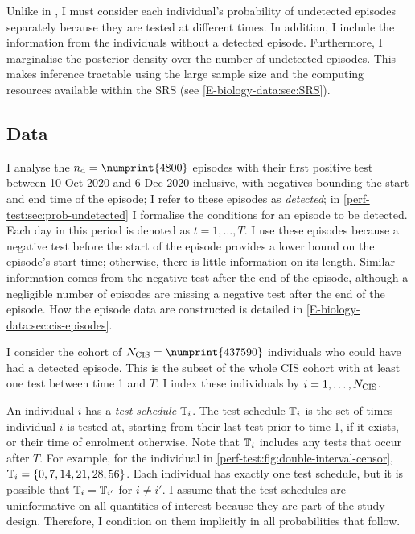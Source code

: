 \documentclass[thesis.tex]{subfiles}
\begin{document}
Unlike in \textcite{heiseyModelling}, I must consider each individual's probability of undetected episodes separately because they are tested at different times.
In addition, I include the information from the individuals without a detected episode.
Furthermore, I marginalise the posterior density over the number of undetected episodes.
This makes inference tractable using the large sample size and the computing resources available within the SRS (see \cref{E-biology-data:sec:SRS}).

\subsection{Data} \label{perf-test:sec:data}

I analyse the $\ndet = \numprint{4800}$ episodes with their first positive test between 10 Oct 2020 and 6 Dec 2020 inclusive, with negatives bounding the start and end time of the episode; I refer to these episodes as \emph{detected}; in \cref{perf-test:sec:prob-undetected} I formalise the conditions for an episode to be detected.
Each day in this period is denoted as $t = 1, \dots, T$.
I use these episodes because a negative test before the start of the episode provides a lower bound on the episode's start time; otherwise, there is little information on its length.
Similar information comes from the negative test after the end of the episode, although a negligible number of episodes are missing a negative test after the end of the episode.
How the episode data are constructed is detailed in \cref{E-biology-data:sec:cis-episodes}.

I consider the cohort of $\Ncis = \numprint{437590}$ individuals who could have had a detected episode.
This is the subset of the whole CIS cohort with at least one test between time 1 and $T$.
I index these individuals by $i = 1, \dots, N_\text{CIS}$.

An individual $i$ has a \emph{test schedule} $\mathbb{T}_i$.
The test schedule $\mathbb{T}_i$ is the set of times individual $i$ is tested at, starting from their last test prior to time 1, if it exists, or their time of enrolment otherwise.
Note that $\mathbb{T}_i$ includes any tests that occur after $T$.
For example, for the individual in \cref{perf-test:fig:double-interval-censor}, $\mathbb{T}_i = \{ 0, 7, 14, 21, 28, 56 \}$.
Each individual has exactly one test schedule, but it is possible that $\mathbb{T}_i = \mathbb{T}_{i'}$ for $i \neq i'$.
I assume that the test schedules are uninformative on all quantities of interest because they are part of the study design.
Therefore, I condition on them implicitly in all probabilities that follow.
\end{document}
